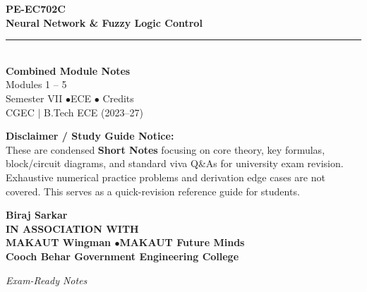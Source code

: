 \documentclass[12pt,a4paper]{article}
\begin{document}
\thispagestyle{empty}


\vspace*{1.0cm}
\begin{center}
  {\Huge\bfseries\color{myred} PE-EC702C}\\[10pt]
  {\LARGE\bfseries\color{mydark} Neural Network \& Fuzzy Logic Control}\\[20pt]
  {\color{myred}\rule{0.7\linewidth}{1.5pt}}\\[18pt]
  {\Large\color{myteal}\textbf{Combined Module Notes}}\\[8pt]
  {\large\color{mydark} Modules 1 -- 5}\\[40pt]
  {\normalsize\color{mydark} Semester VII \quad$\bullet$\quad ECE \quad$\bullet$ Credits}\\[12pt]
  {\normalsize\color{mydark} CGEC \;$|$\; B.Tech ECE (2023--27)}
\end{center}
\vspace{1.0cm}
\begin{center}
  \begin{tcolorbox}[colback=mygray, colframe=mgframe, boxrule=0.5pt, arc=3pt, width=0.85\linewidth]
    \centering\small\color{mydark}
    \textbf{Disclaimer / Study Guide Notice:}\\
    These are condensed \textbf{Short Notes} focusing on core theory, key formulas, block/circuit diagrams, and standard viva Q\&As for university exam revision. Exhaustive numerical practice problems and derivation edge cases are not covered. This serves as a quick-revision reference guide for students.
  \end{tcolorbox}
\end{center}
\vfill
\vspace{0.6cm}
\begin{center}
  {\large\bfseries\color{mypurple} Biraj Sarkar}\\[16pt]
  {\footnotesize\color{watermark}\textbf{IN ASSOCIATION WITH}}\\[8pt]
  {\small\bfseries\color{mydark} MAKAUT Wingman \quad$\bullet$\quad MAKAUT Future Minds}\\[12pt]
  {\large\bfseries\color{myteal} Cooch Behar Government Engineering College}
\end{center}
\vfill
\begin{center}{\small\color{watermark}\textit{Exam-Ready Notes}}\end{center}
\clearpage
\end{document}
